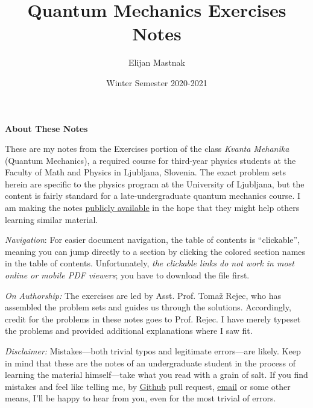 \documentclass[11pt, a4paper]{article}
\begin{document}
\title{Quantum Mechanics Exercises Notes}
\author{Elijan Mastnak}
\date{Winter Semester 2020-2021}
\maketitle



\begin{center}
\textbf{About These Notes}
\end{center}

These are my notes from the Exercises portion of the class \textit{Kvanta Mehanika} (Quantum Mechanics), a required course for third-year physics students at the Faculty of Math and Physics in Ljubljana, Slovenia. The exact problem sets herein are specific to the physics program at the University of Ljubljana, but the content is fairly standard for a late-undergraduate quantum mechanics course. I am making the notes \href{https://github.com/ejmastnak/fmf/tree/main/quantum-mechanics/qm-vaje}{\underline{publicly available}}  in the hope that they might help others learning similar material.

\vspace{2mm}
\textit{Navigation}: For easier document navigation, the table of contents is ``clickable'', meaning you can jump directly to a section by clicking the colored section names in the table of contents. Unfortunately, \textit{the clickable links do not work in most online or mobile PDF viewers}; you have to download the file first.

\vspace{2mm}
\textit{On Authorship:} 
The exercises are led by Asst. Prof. Toma\v{z} Rejec, who has assembled the problem sets and guides us through the solutions. Accordingly, credit for the problems in these notes goes to Prof. Rejec. I have merely typeset the problems and provided additional explanations where I saw fit.

\vspace{2mm}
\textit{Disclaimer:} Mistakes---both trivial typos and legitimate errors---are likely. Keep in mind that these are the notes of an undergraduate student in the process of learning the material himself---take what you read with a grain of salt. If you find mistakes and feel like telling me, by \href{https://github.com/ejmastnak/fmf}{\underline{Github}} pull request, \href{mailto:ejmastnak@gmail.com}{\underline{email}} or some other means, I'll be happy to hear from you, even for the most trivial of errors.
\end{document}
